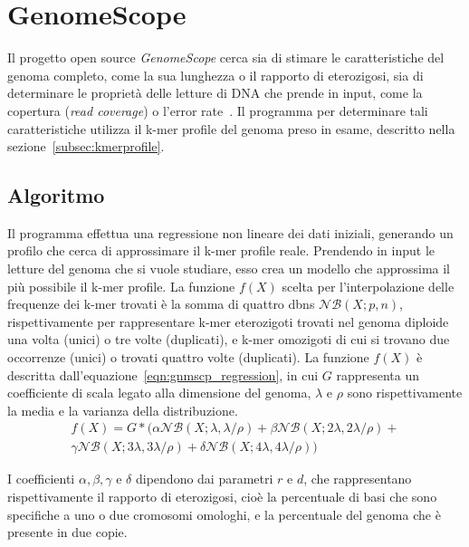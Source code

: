 \documentclass[crop=false, class=book]{standalone}
\begin{document}
	\chapter{GenomeScope}
	
	Il progetto open source \textit{GenomeScope} cerca sia di stimare le caratteristiche del genoma completo, come la sua lunghezza o il rapporto di eterozigosi, sia di determinare le proprietà delle letture di DNA che prende in input, come la copertura (\textit{read coverage}) o l'error rate~\cite{vurture2017genomescope}. Il programma per determinare tali caratteristiche utilizza il k-mer profile del genoma preso in esame, descritto nella sezione~\vref{subsec:kmerprofile}.
		

	\section{Algoritmo}
	Il programma effettua una regressione non lineare dei dati iniziali, generando un profilo che cerca di approssimare il k-mer profile reale. Prendendo in input le letture del genoma che si vuole studiare, esso crea un modello che approssima il più possibile il k-mer profile. La funzione $f(X)$ scelta per l'interpolazione delle frequenze dei k-mer trovati è la somma di quattro \glspl{dbn} $\mathcal{NB}(X;p,n)$, rispettivamente per rappresentare k-mer eterozigoti trovati nel genoma diploide una volta (unici) o tre volte (duplicati), e k-mer omozigoti di cui si trovano due occorrenze (unici) o trovati quattro volte (duplicati). La funzione $f(X)$ è descritta dall'equazione~\vref{eqn:gnmscp_regression}, in cui $G$ rappresenta un coefficiente di scala legato alla dimensione del genoma, $\lambda$ e $\rho$ sono rispettivamente la media e la varianza della distribuzione. 
	\begin{multline}
		f(X) = G * (\alpha \mathcal{NB}(X;\lambda, \lambda/\rho) + \beta \mathcal{NB}(X;2\lambda, 2\lambda/\rho) + \\
		\gamma \mathcal{NB}(X;3\lambda, 3\lambda/\rho) + \delta \mathcal{NB}(X;4\lambda, 4\lambda/\rho)  )	
		\label{eqn:gnmscp_regression}
	\end{multline}

	I coefficienti $\alpha, \beta, \gamma$ e $\delta$ dipendono dai parametri $r$ e $d$, che rappresentano rispettivamente il rapporto di eterozigosi, cioè la percentuale di basi che sono specifiche a uno o due cromosomi omologhi, e la percentuale del genoma che è presente in due copie.
	
\end{document}
